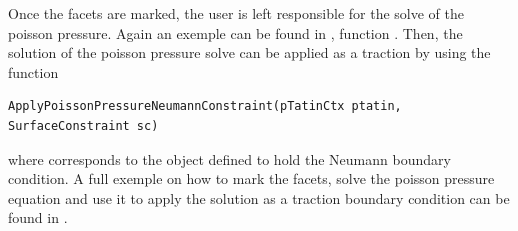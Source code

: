 Once the facets are marked, the user is left responsible for the solve of the poisson pressure.
Again an exemple can be found in , function .
Then, the solution of the poisson pressure solve can be applied as a traction by using the function 
\begin{lstlisting}
ApplyPoissonPressureNeumannConstraint(pTatinCtx ptatin, SurfaceConstraint sc)
\end{lstlisting}
where  corresponds to the object defined to hold the Neumann boundary condition.
A full exemple on how to mark the facets, solve the poisson pressure equation and use it to apply the solution as a traction boundary condition can be found in .
